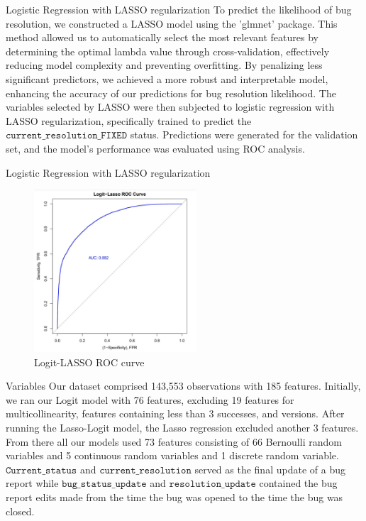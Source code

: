 \documentclass[10pt]{beamer}
\begin{document}
\begin{frame}[t]{Logistic Regression with LASSO regularization} \justifying \vspace{10pt}
	To predict the likelihood of bug resolution, we constructed a LASSO model using the 'glmnet' package. This method allowed us to automatically select the most relevant features by determining the optimal lambda value through cross-validation, effectively reducing model complexity and preventing overfitting. By penalizing less significant predictors, we achieved a more robust and interpretable model, enhancing the accuracy of our predictions for bug resolution likelihood.
	\vskip 16pt 
	The variables selected by LASSO were then subjected to logistic regression with LASSO regularization, specifically trained to predict the $\texttt{current\_resolution\_FIXED}$ status. Predictions were generated for the validation set, and the model's performance was evaluated using ROC analysis.
\end{frame}


\begin{frame}[t]{Logistic Regression with LASSO regularization}\justifying \vspace{1pt}
	\begin{figure}[htp]
		\centering
		\includegraphics[width=0.54\textwidth]{./Logit-Lasso_ROC.jpg}
		\caption{Logit-LASSO ROC curve}
		\label{fig:picture1}
	\end{figure}
\end{frame}


\begin{frame}[t]{Variables} \justifying \vspace{25pt}
	Our dataset comprised 143,553 observations with 185 features. Initially, we ran our Logit model with 76 features, excluding 19 features for multicollinearity, features containing less than 3 successes, and versions. After running the Lasso-Logit model, the Lasso regression excluded another 3 features. From there  all our models used 73 features consisting of 66 Bernoulli random variables and 5 continuous random variables and 1 discrete random variable. 
	$\texttt{Current\_status}$ and $\texttt{current\_resolution}$ served as the final update of a bug report while $\texttt{bug\_status\_update}$ and $\texttt{resolution\_update}$ contained the bug report edits made from the time the bug was opened to the time the bug was closed. 
\end{frame}
\end{document}
